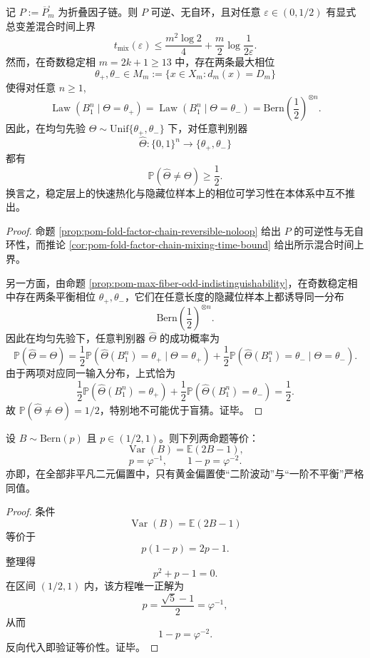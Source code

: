 \begin{theorem}[稳定层快速热化与隐藏相位不可学习的严格分裂]\label{thm:conclusion-maxfiber-mixing-vs-hiddenbit-unlearnability}
记 \(P:=\overline P_m^{\square}\) 为折叠因子链。则 \(P\) 可逆、无自环，且对任意 \(\varepsilon\in(0,1/2)\) 有显式总变差混合时间上界
\[
t_{\mathrm{mix}}(\varepsilon)
\le
\frac{m^2\log 2}{4}
+
\frac{m}{2}\log\frac{1}{2\varepsilon}.
\]
然而，在奇数稳定相 \(m=2k+1\ge 13\) 中，存在两条最大相位
\[
\theta_+,\theta_-\in M_m:=\{x\in X_m:d_m(x)=D_m\}
\]
使得对任意 \(n\ge 1\),
\[
\operatorname{Law}(B_1^n\mid \Theta=\theta_+)
=
\operatorname{Law}(B_1^n\mid \Theta=\theta_-)
=
\mathrm{Bern}\!\left(\frac12\right)^{\otimes n}.
\]
因此，在均匀先验 \(\Theta\sim \mathrm{Unif}\{\theta_+,\theta_-\}\) 下，对任意判别器
\[
\widehat\Theta:\{0,1\}^n\to \{\theta_+,\theta_-\}
\]
都有
\[
\mathbb P(\widehat\Theta\neq \Theta)\ge \frac12.
\]
换言之，稳定层上的快速热化与隐藏位样本上的相位可学习性在本体系中互不推出。
\end{theorem}
\begin{proof}
命题 \ref{prop:pom-fold-factor-chain-reversible-noloop} 给出 \(P\) 的可逆性与无自环性，而推论 \ref{cor:pom-fold-factor-chain-mixing-time-bound} 给出所示混合时间上界。

另一方面，由命题 \ref{prop:pom-max-fiber-odd-indistinguishability}，在奇数稳定相中存在两条平衡相位 \(\theta_+,\theta_-\)，它们在任意长度的隐藏位样本上都诱导同一分布
\[
\mathrm{Bern}\!\left(\frac12\right)^{\otimes n}.
\]
因此在均匀先验下，任意判别器 \(\widehat\Theta\) 的成功概率为
\[
\mathbb P(\widehat\Theta=\Theta)
=
\frac12\mathbb P(\widehat\Theta(B_1^n)=\theta_+\mid \Theta=\theta_+)
+
\frac12\mathbb P(\widehat\Theta(B_1^n)=\theta_-\mid \Theta=\theta_-).
\]
由于两项对应同一输入分布，上式恰为
\[
\frac12\mathbb P(\widehat\Theta(B_1^n)=\theta_+)
+
\frac12\mathbb P(\widehat\Theta(B_1^n)=\theta_-)
=
\frac12.
\]
故 \(\mathbb P(\widehat\Theta\neq\Theta)=1/2\)，特别地不可能优于盲猜。证毕。
\end{proof}

\begin{theorem}[黄金偏置的二阶唯一性]\label{thm:conclusion-golden-bias-second-order-uniqueness}
设 \(B\sim \mathrm{Bern}(p)\) 且 \(p\in(1/2,1)\)。则下列两命题等价：
\[
\operatorname{Var}(B)=\mathbb E(2B-1),
\]
\[
p=\varphi^{-1},
\qquad
1-p=\varphi^{-2}.
\]
亦即，在全部非平凡二元偏置中，只有黄金偏置使“二阶波动”与“一阶不平衡”严格同值。
\end{theorem}
\begin{proof}
条件
\[
\operatorname{Var}(B)=\mathbb E(2B-1)
\]
等价于
\[
p(1-p)=2p-1.
\]
整理得
\[
p^2+p-1=0.
\]
在区间 \((1/2,1)\) 内，该方程唯一正解为
\[
p=\frac{\sqrt5-1}{2}=\varphi^{-1},
\]
从而
\[
1-p=\varphi^{-2}.
\]
反向代入即验证等价性。证毕。
\end{proof}
